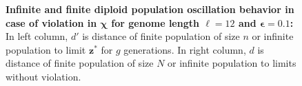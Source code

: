 \begin{figure}[h]
\begin{center}
\hspace{-3em}%
\vspace{-0.5em}  \hspace{-3em}%


\caption{\textbf{Infinite and finite diploid population oscillation behavior in case of violation in $\bm{\chi}$ for genome length $\ell = 12$ and $\bm{\epsilon} = 0.1$:} 
  In left column, $d'$ is distance of finite population of size $n$ or infinite population to limit $\bm{z}^\ast$ for $g$ generations. In right column, $d$ is distance of finite population of size $N$ or infinite population to limits without violation.}
\label{oscillation_12d_vio_chi_0.1}
\end{center}
\end{figure}

